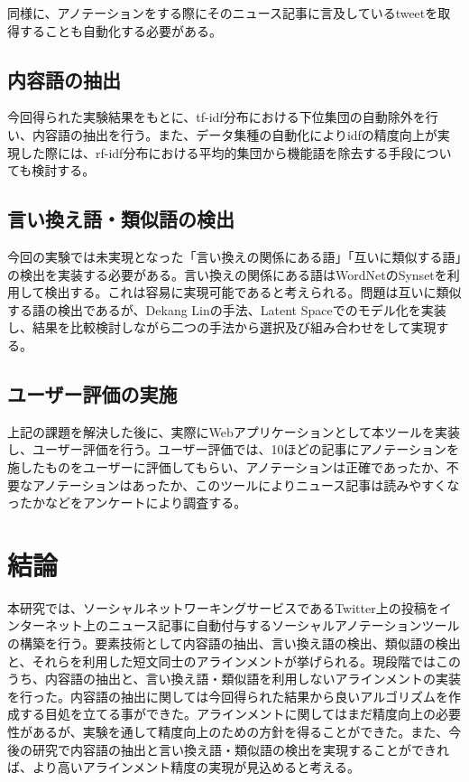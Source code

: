 \documentclass[12pt]{jarticle}
\begin{document}
同様に、アノテーションをする際にそのニュース記事に言及しているtweetを取得することも自動化する必要がある。

\subsection{内容語の抽出}
今回得られた実験結果をもとに、tf-idf分布における下位集団の自動除外を行い、内容語の抽出を行う。また、データ集種の自動化によりidfの精度向上が実現した際には、rf-idf分布における平均的集団から機能語を除去する手段についても検討する。

\subsection{言い換え語・類似語の検出}
今回の実験では未実現となった「言い換えの関係にある語」「互いに類似する語」の検出を実装する必要がある。言い換えの関係にある語はWordNetのSynsetを利用して検出する。これは容易に実現可能であると考えられる。問題は互いに類似する語の検出であるが、Dekang Linの手法\cite{DekangLin}、Latent Spaceでのモデル化\cite{LatentSpace}を実装し、結果を比較検討しながら二つの手法から選択及び組み合わせをして実現する。

\subsection{ユーザー評価の実施}
上記の課題を解決した後に、実際にWebアプリケーションとして本ツールを実装し、ユーザー評価を行う。ユーザー評価では、10ほどの記事にアノテーションを施したものをユーザーに評価してもらい、アノテーションは正確であったか、不要なアノテーションはあったか、このツールによりニュース記事は読みやすくなったかなどをアンケートにより調査する。

\section{結論}
本研究では、ソーシャルネットワーキングサービスであるTwitter上の投稿をインターネット上のニュース記事に自動付与するソーシャルアノテーションツールの構築を行う。要素技術として内容語の抽出、言い換え語の検出、類似語の検出と、それらを利用した短文同士のアラインメントが挙げられる。現段階ではこのうち、内容語の抽出と、言い換え語・類似語を利用しないアラインメントの実装を行った。内容語の抽出に関しては今回得られた結果から良いアルゴリズムを作成する目処を立てる事ができた。アラインメントに関してはまだ精度向上の必要性があるが、実験を通して精度向上のための方針を得ることができた。また、今後の研究で内容語の抽出と言い換え語・類似語の検出を実現することができれば、より高いアラインメント精度の実現が見込めると考える。
\end{document}
